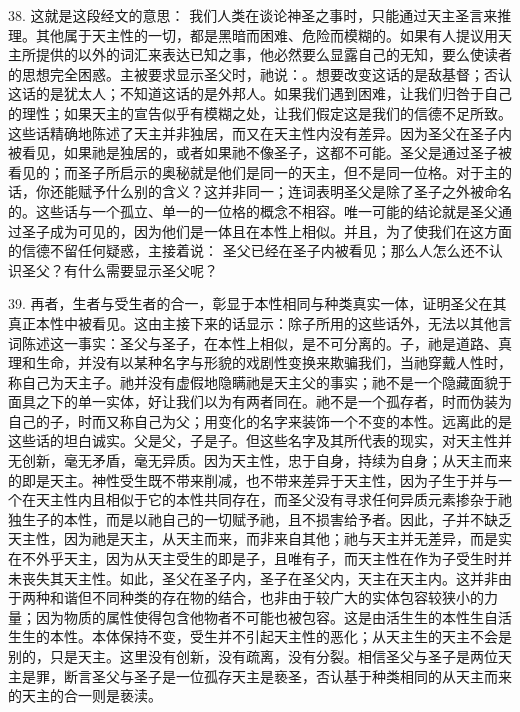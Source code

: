 38. 这就是这段经文的意思： 我们人类在谈论神圣之事时，只能通过天主圣言来推理。其他属于天主性的一切，都是黑暗而困难、危险而模糊的。如果有人提议用天主所提供的以外的词汇来表达已知之事，他必然要么显露自己的无知，要么使读者的思想完全困惑。主被要求显示圣父时，祂说：。想要改变这话的是敌基督；否认这话的是犹太人；不知道这话的是外邦人。如果我们遇到困难，让我们归咎于自己的理性；如果天主的宣告似乎有模糊之处，让我们假定这是我们的信德不足所致。这些话精确地陈述了天主并非独居，而又在天主性内没有差异。因为圣父在圣子内被看见，如果祂是独居的，或者如果祂不像圣子，这都不可能。圣父是通过圣子被看见的；而圣子所启示的奥秘就是他们是同一的天主，但不是同一位格。对于主的话，你还能赋予什么别的含义？这并非同一；连词表明圣父是除了圣子之外被命名的。这些话与一个孤立、单一的一位格的概念不相容。唯一可能的结论就是圣父通过圣子成为可见的，因为他们是一体且在本性上相似。并且，为了使我们在这方面的信德不留任何疑惑，主接着说： 圣父已经在圣子内被看见；那么人怎么还不认识圣父？有什么需要显示圣父呢？\par

39. 再者，生者与受生者的合一，彰显于本性相同与种类真实一体，证明圣父在其真正本性中被看见。这由主接下来的话显示：除子所用的这些话外，无法以其他言词陈述这一事实：圣父与圣子，在本性上相似，是不可分离的。子，祂是道路、真理和生命，并没有以某种名字与形貌的戏剧性变换来欺骗我们，当祂穿戴人性时，称自己为天主子。祂并没有虚假地隐瞒祂是天主父的事实；祂不是一个隐藏面貌于面具之下的单一实体，好让我们以为有两者同在。祂不是一个孤存者，时而伪装为自己的子，时而又称自己为父；用变化的名字来装饰一个不变的本性。远离此的是这些话的坦白诚实。父是父，子是子。但这些名字及其所代表的现实，对天主性并无创新，毫无矛盾，毫无异质。因为天主性，忠于自身，持续为自身；从天主而来的即是天主。神性受生既不带来削减，也不带来差异于天主性，因为子生于并与一个在天主性内且相似于它的本性共同存在，而圣父没有寻求任何异质元素掺杂于祂独生子的本性，而是以祂自己的一切赋予祂，且不损害给予者。因此，子并不缺乏天主性，因为祂是天主，从天主而来，而非来自其他；祂与天主并无差异，而是实在不外乎天主，因为从天主受生的即是子，且唯有子，而天主性在作为子受生时并未丧失其天主性。如此，圣父在圣子内，圣子在圣父内，天主在天主内。这并非由于两种和谐但不同种类的存在物的结合，也非由于较广大的实体包容较狭小的力量；因为物质的属性使得包含他物者不可能也被包容。这是由活生生的本性生自活生生的本性。本体保持不变，受生并不引起天主性的恶化；从天主生的天主不会是别的，只是天主。这里没有创新，没有疏离，没有分裂。相信圣父与圣子是两位天主是罪，断言圣父与圣子是一位孤存天主是亵圣，否认基于种类相同的从天主而来的天主的合一则是亵渎。\par

